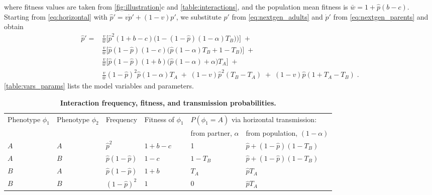 \documentclass[12pt]{extarticle}
\begin{document}
where fitness values are taken from \autoref{fig:illustration}c and \autoref{table:interactions}, and the population mean fitness is
$\bar{w} =  1 + \hat{p}(b-c)$.
Starting from \autoref{eq:horizontal} with $\hat{p}'=v\dot{p}'+(1-v)p'$, we substitute $p'$ from \autoref{eq:nextgen_adults} and $\dot{p}'$ from \autoref{eq:nextgen_parents} and obtain
\begin{equation} \label{eq:nextgen_juveniles}
\begin{aligned}
\hat{p}' =
& \frac{v}{\bar{w}}\Big[\hat{p}^2(1+b-c)\Big(1-(1-\hat{p})(1-\alpha)T_B)\Big)\Big] \;+ \\
& \frac{v}{\bar{w}}\Big[ \hat{p}(1-\hat{p})(1-c)\big( \hat{p}(1-\alpha)T_B + 1 - T_B \big) \Big] \;+ \\
& \frac{v}{\bar{w}}\Big[ \hat{p}(1-\hat{p})(1+b)\big(\hat{p}(1-\alpha) + \alpha \big) T_A \Big] \;+ \\
& \frac{v}{\bar{w}}(1-\hat{p})^2\hat{p}(1-\alpha)T_A \;+\;
(1-v)\hat{p}^2(T_B-T_A) \;+\;
(1-v)\hat{p}(1+T_A-T_B) \;.
\end{aligned}
\end{equation}
\autoref{table:vars_params} lists the model variables and parameters.

\begin{table}[p]
  \caption{\textbf{Interaction frequency, fitness, and transmission probabilities.}}
  \begin{tabular}{@{}llllll@{}}
  \toprule
  \multirow{2}{*}{Phenotype $\phi_1$} &
    \multirow{2}{*}{Phenotype $\phi_2$} &
    \multirow{2}{*}{Frequency} &
    \multirow{2}{*}{Fitness of $\phi_1$} &
    \multicolumn{2}{l}{$P(\phi_1=A)$ via horizontal transmission:} \\ \cmidrule(l){5-6} 
      &     &                      &         & from partner, $\alpha$ & from population, $(1-\alpha)$ \\ \cmidrule(r){1-6}
  $A$ & $A$ & $\hat{p}^2$          & $1+b-c$ & 1                      & $\hat{p}+(1-\hat{p})(1-T_B)$  \\
  $A$ & $B$ & $\hat{p}(1-\hat{p})$ & $1-c$   & $1-T_B$                & $\hat{p}+(1-\hat{p})(1-T_B)$  \\
  $B$ & $A$ & $\hat{p}(1-\hat{p})$ & $1+b$   & $T_A$                  & $\hat{p} T_A$                 \\
  $B$ & $B$ & $(1-\hat{p})^2$      & $1$     & $0$                    & $\hat{p} T_A$                 \\ \bottomrule
  \end{tabular}
  \label{table:interactions}
\end{table}
\bigskip
\end{document}
